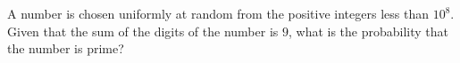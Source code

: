A number is chosen uniformly at random from the positive integers less than $10^8$. Given that the sum of the digits of the number is $9$, what is the probability that the number is prime?
